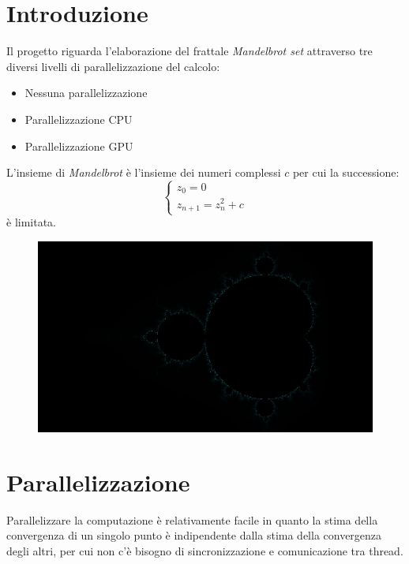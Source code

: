 \documentclass[12pt]{article}
\begin{document}
\maketitle

\newpage

\section{Introduzione}

Il progetto riguarda l'elaborazione del frattale \emph{Mandelbrot set} attraverso tre diversi livelli di parallelizzazione del calcolo:
\begin{itemize}
\item Nessuna parallelizzazione 
\item Parallelizzazione CPU
\item Parallelizzazione GPU
\end{itemize}
L'insieme di \emph{Mandelbrot} è l'insieme dei numeri complessi $c$ per cui la successione:
$$
\begin{cases}
	z_0 = 0\\
	z_{n+1} = z_n^{2} + c
\end{cases}
$$
è limitata.

\begin{figure}[h]
\includegraphics[width=\textwidth]{mandelbrot.jpg}
\centering
\end{figure}

\section{Parallelizzazione}

Parallelizzare la computazione è relativamente facile in quanto la stima della convergenza di un singolo punto è indipendente dalla stima della convergenza degli altri, per cui non c'è bisogno di sincronizzazione e comunicazione tra thread.
\end{document}
